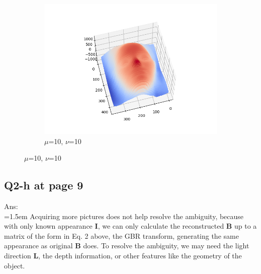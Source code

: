 \documentclass{article}
\begin{document}
\begin{figure}[H]
\begin{subfigure}{0.32\textwidth}
	\end{subfigure}
	\hfill
	\begin{subfigure}{0.32\textwidth}
	\centering
	\includegraphics[width=\textwidth]{./src/2g_all_change/faceCalibrated_mu_10_v_10_lambda_10.png}
	\caption{$\mu$=10, $\nu$=10}
	\end{subfigure}	
\end{figure}

	\newpage
	\subsection*{Q2-h at page 9}
	Ans:\\
	\hangindent=1.5em \hspace{1.5em}Acquiring more pictures does not help resolve the ambiguity, because with only known appearance $\mathbf{I}$, we can only calculate the reconstructed $\mathbf{B}$ up to a matrix of the form in Eq. 2 above, the GBR transform, generating the same appearance as original $\mathbf{B}$ does. To resolve the ambiguity, we may need the light direction $\mathbf{L}$, the depth information, or other features like the geometry of the object.



	\newpage
\end{document}
